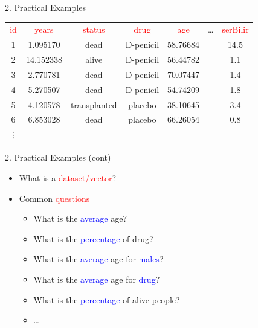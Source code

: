 \documentclass[14pt, aspectratio=169, sectionpage=simple, xclolor=table]{beamer}
\begin{document}
 \begin{frame}[fragile]{2. Practical Examples}
\begin{tabular}{ccccccc}
	\textcolor{red}{id} &  \textcolor{red}{years} &  \textcolor{red}{status}  &  \textcolor{red}{drug} &  \textcolor{red}{age} & \dots &  \textcolor{red}{serBilir}\\
	1& 1.095170& dead&   D-penicil & 58.76684 & & 14.5\\
	2& 14.152338& alive&   D-penicil & 56.44782 & & 1.1\\
	3& 2.770781& dead& D-penicil & 70.07447 & & 1.4\\
	4& 5.270507& dead& D-penicil & 54.74209 & & 1.8\\
	5& 4.120578& transplanted&   placebo & 38.10645 & & 3.4\\                                                   
	6& 6.853028& dead&   placebo & 66.26054 & & 0.8\\
	\vdots &&&&&&
\end{tabular}
\end{frame}
\begin{frame}[fragile]{2. Practical Examples (cont)}
\begin{itemize}
	\item What is a \textcolor{red}{dataset/vector}?
	\vspace{1ex}\vspace{1ex}
	\item Common \textcolor{red}{questions}
	\vspace{1ex}
	\begin{itemize}
		\item What is the \textcolor{blue}{average} age?
		\item What is the \textcolor{blue}{percentage} of drug?
		\item What is the \textcolor{blue}{average} age for \textcolor{blue}{males}?
		\item What is the \textcolor{blue}{average} age for \textcolor{blue}{drug}?
		\item What is the \textcolor{blue}{percentage} of alive people?
		\item \dots
	\end{itemize}
\end{itemize}
\end{frame}
\end{document}
